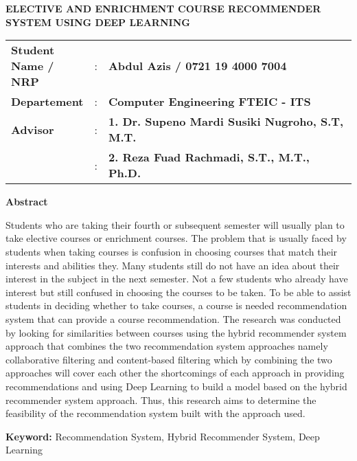 {
\begin{center}
    \uppercase{\textbf{\large Elective and Enrichment Course Recommender System using Deep Learning}}
\end{center}

\vspace*{6 mm}
\begin{adjustwidth}{}{}
    \begin{tabular}{lcp{1\linewidth}}
        \noindent\textbf{Student Name / NRP} & : & \textbf{Abdul Azis / 0721 19 4000 7004}                \\
        \noindent\textbf{Departement}        & : & \textbf{Computer Engineering FTEIC - ITS}              \\
        \noindent\textbf{Advisor}            & : & \textbf{1. Dr. Supeno Mardi Susiki Nugroho, S.T, M.T.} \\
                                             & : & \textbf{2. Reza Fuad Rachmadi, S.T., M.T., Ph.D.}      \\
    \end{tabular}
\end{adjustwidth}

\vspace{6 mm}
\noindent
\textbf{Abstract}
\vspace{3 mm}

Students who are taking their fourth or subsequent semester will usually plan to take elective courses or enrichment courses.
The problem that is usually faced by students when taking courses is confusion in choosing courses that match their interests and abilities
they. Many students still do not have an idea about their interest in the subject in the next semester. Not a few students who already have
interest but still confused in choosing the courses to be taken. To be able to assist students in deciding whether to take courses, a course is needed
recommendation system that can provide a course recommendation. The research was conducted by looking for similarities between courses using the hybrid recommender system approach that combines the two
recommendation system approaches namely collaborative filtering and content-based filtering which by combining the two approaches will cover each other
the shortcomings of each approach in providing recommendations and using Deep Learning to build a model based on the hybrid recommender system approach. Thus, this research
aims to determine the feasibility of the recommendation system built with the approach used.

\vspace{6 mm}
\noindent
\textbf{Keyword: }Recommendation System, Hybrid Recommender System, Deep Learning
}



